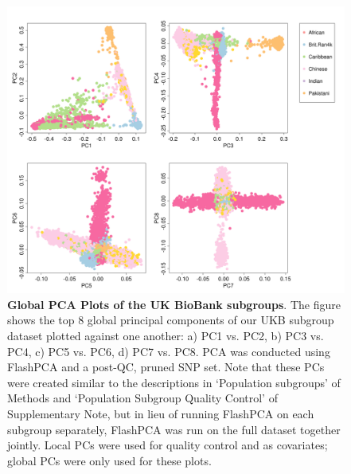 \documentclass[12pt,a4paper]{article}
\begin{document}
\begin{figure}[htbp]
\centering
\hspace*{-1cm}
\includegraphics[scale=.4]{Images/Supp/InterPath_Supp_Figure_UKB_PCAPlot_vs1.png}
\caption[TBD]{\textbf{Global PCA Plots of the UK BioBank subgroups}. The figure shows the top 8 global principal components of our UKB subgroup dataset plotted against one another: a) PC1 vs. PC2, b) PC3 vs. PC4, c) PC5 vs. PC6, d) PC7 vs. PC8. PCA was conducted using FlashPCA \citep{Abraham2017} and a post-QC, pruned SNP set. Note that these PCs were created similar to the descriptions in `Population subgroups' of Methods and `Population Subgroup Quality Control' of Supplementary Note, but in lieu of running FlashPCA on each subgroup separately, FlashPCA was run on the full dataset together jointly. Local PCs were used for quality control and as covariates; global PCs were only used for these plots.}
\label{InterPath-Supp-Figure-UKB-subgroups-PCAPlot}
\end{figure}
\clearpage
\end{document}
